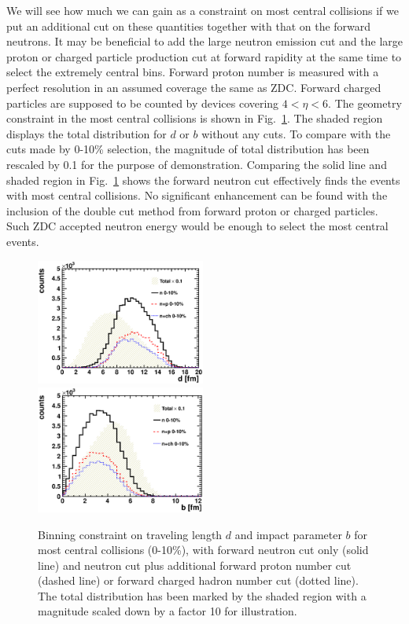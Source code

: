 We will see how much we can gain as a constraint on
most central collisions if we put an additional cut on these quantities together
with that on the forward neutrons. It may be beneficial to add the large neutron emission cut
and the large proton or charged particle production cut at forward rapidity at
the same time to select the extremely central bins. Forward proton number is
measured with a perfect resolution in an assumed coverage the same as ZDC.
Forward charged particles are supposed to be counted by devices covering
$4<\eta<6$. The geometry constraint in the most central collisions is
shown in Fig.~\ref{fig:geoConstrain_central}. The shaded region displays the total
distribution for $d$ or $b$ without any cuts. To compare with the cuts made by
0-10\% selection, the magnitude of total distribution has been rescaled by 0.1 for the purpose of
demonstration. Comparing the solid line and shaded region in
Fig.~\ref{fig:geoConstrain_central} shows the forward neutron cut effectively finds
the events with most central collisions. No significant enhancement can be found
with the inclusion of the double cut method from forward proton or charged
particles. Such ZDC accepted neutron energy would be enough to select
the most central events.
\begin{figure} 
\begin{center} 
\includegraphics[width=0.495\textwidth]{plots/chpt7/tau9_mostCentral_dist.eps} \label{fig:travelConstrain_central} 
\includegraphics[width=0.495\textwidth]{plots/chpt7/tau9_mostCentral_bimpact.eps} \label{fig:bimpConstrain_central} 
\caption[The selected impact parameter and traveling distance in the most central collisions selected under a double cut method]
{Binning constraint on traveling length $d$ and impact parameter $b$ for most
central collisions (0-10\%), with forward neutron cut only (solid line) and
neutron cut plus additional forward proton number cut (dashed line) or forward
charged hadron number cut (dotted line). The total distribution has been marked by
the shaded region with a magnitude scaled down by a factor 10 for illustration.
}
\label{fig:geoConstrain_central}
\end{center} 
\end{figure}


